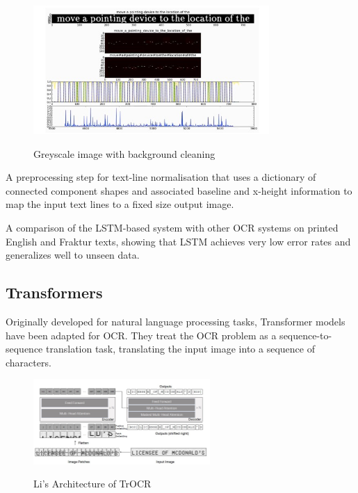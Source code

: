 \begin{figure}[ht]
    \centering
    \includegraphics[width=0.8\textwidth]{Figures/LSTM_Breuel.jpg}
    \caption[Bruel's illustration of the training steps of the LSTM recognizer]{Greyscale image with background cleaning}\cite{breuelHighPerformanceOCRPrinted2013}
    \label{fig:Breuel LSTM Paper}
\end{figure}



A preprocessing step for text-line normalisation that uses a dictionary of connected component shapes and associated baseline and x-height information to map the input text lines to a fixed size output image.

A comparison of the LSTM-based system with other OCR systems on printed English and Fraktur texts, showing that LSTM achieves very low error rates and generalizes well to unseen data.

\newpage

\subsection{Transformers}

Originally developed for natural language processing tasks, Transformer models have been adapted for OCR. They treat the OCR problem as a sequence-to-sequence translation task, translating the input image into a sequence of characters.

\begin{figure}[ht]
    \centering
    \includegraphics[width=0.6\textwidth]{Figures/Trans_MLi.jpg}
    \caption[Li's Architecture of TrOCR]{Li's Architecture of TrOCR}\cite{liTrOCRTransformerBasedOptical2023}
    \label{fig:Li's Architecture of TrOCR}
\end{figure}

